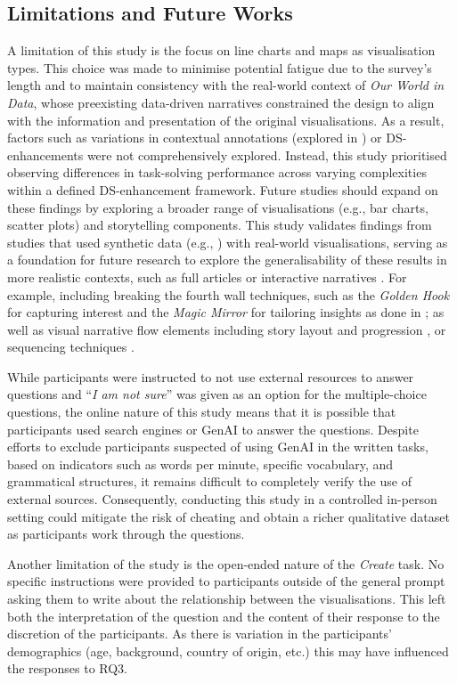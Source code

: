 \subsection{Limitations and Future Works}
A limitation of this study is the focus on line charts and maps as visualisation types. This choice was made to minimise potential fatigue due to the survey's length \cite{fereshteh2018evaluating} and to maintain consistency with the real-world context of \textit{Our World in Data}, whose preexisting data-driven narratives constrained the design to align with the information and presentation of the original visualisations. As a result, factors such as variations in contextual annotations (explored in \citet{stokes2023striking}) or DS-enhancements were not comprehensively explored. Instead, this study prioritised observing differences in task-solving performance across varying complexities within a defined DS-enhancement framework. Future studies should expand on these findings by exploring a broader range of visualisations (e.g., bar charts, scatter plots) and storytelling components. This study validates findings from studies that used synthetic data (e.g., \citet{stokes2023striking}) with real-world visualisations, serving as a foundation for future research to explore the generalisability of these results in more realistic contexts, such as full articles \cite{rogha2024impact} or interactive narratives \cite{shi2023breaking,morth2023scrollyvis}. For example, including breaking the fourth wall techniques, such as the \textit{Golden Hook} for capturing interest and the \textit{Magic Mirror} for tailoring insights as done in \citet{shi2023breaking}; as well as visual narrative flow elements including story layout and progression \cite{mckenna2017visual}, or sequencing techniques \cite{hullman2013deeper}.

While participants were instructed to not use external resources to answer questions and ``\textit{I am not sure}'' was given as an option for the multiple-choice questions, the online nature of this study means that it is possible that participants used search engines or GenAI to answer the questions. Despite efforts to exclude participants suspected of using GenAI in the written tasks, based on indicators such as words per minute, specific vocabulary, and grammatical structures, it remains difficult to completely verify the use of external sources. Consequently, conducting this study in a controlled in-person setting could mitigate the risk of cheating and obtain a richer qualitative dataset as participants work through the questions.

Another limitation of the study is the open-ended nature of the \textit{Create} task. No specific instructions were provided to participants outside of the general prompt asking them to write about the relationship between the visualisations. This left both the interpretation of the question and the content of their response to the discretion of the participants. As there is variation in the participants' demographics (age, background, country of origin, etc.) this may have influenced the responses to RQ3.

